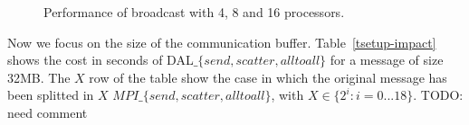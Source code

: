 \begin{figure}[p]
	\caption{Performance of broadcast with 4, 8 and 16 processors.}
	\label{pianosa-mpi-3}
\end{figure}

Now we focus on the size of the communication buffer. Table~\ref{tsetup-impact} shows the cost in seconds of DAL$\_\lbrace send, scatter, alltoall \rbrace$ for a message of size 32MB. The $X$ row of the table show the case in which the original message has been splitted in $X$ $MPI\_\lbrace send, scatter, alltoall \rbrace$, with $X \in \lbrace 2^i : i = 0...18 \rbrace$. TODO: need comment
